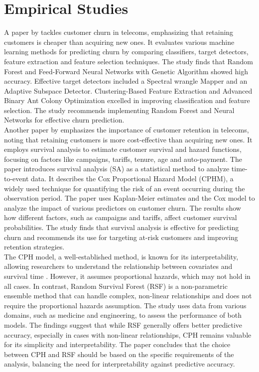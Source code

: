 \documentclass[doublespacing,12pt]{report}
\begin{document}
\section{Empirical Studies}
A paper by \cite{imani2020customer} tackles customer churn in telecoms, emphasizing that retaining customers is cheaper than acquiring new ones. It evaluates various machine learning methods for predicting churn by comparing classifiers, target detectors, feature extraction and feature selection techniques. The study finds that Random Forest and Feed-Forward Neural Networks with Genetic Algorithm showed high accuracy. Effective target detectors included a Spectral wrangle Mapper and an Adaptive Subspace Detector. Clustering-Based Feature Extraction and Advanced Binary Ant Colony Optimization excelled in improving classification and feature selection. The study recommends implementing Random Forest and Neural Networks for effective churn prediction.\\
Another paper by \cite{masarifoglu2019applying} emphasizes the importance of customer retention in telecoms, noting that retaining customers is more cost-effective than acquiring new ones. It employs survival analysis to estimate customer survival and hazard functions, focusing on factors like campaigns, tariffs, tenure, age and auto-payment. The paper introduces survival analysis (SA) as a statistical method to analyze time-to-event data. It describes the Cox Proportional Hazard Model (CPHM), a widely used technique for quantifying the risk of an event occurring during the observation period. The paper uses Kaplan-Meier estimates and the Cox model to analyze the impact of various predictors on customer churn. The results show how different factors, such as campaigns and tariffs, affect customer survival probabilities. The study finds that survival analysis is effective for predicting churn and recommends its use for targeting at-risk customers and improving retention strategies.\\
The CPH model, a well-established method, is known for its interpretability, allowing researchers to understand the relationship between covariates and survival time \cite{nurhaliza2022comparison}. However, it assumes proportional hazards, which may not hold in all cases. In contrast, Random Survival Forest (RSF) is a non-parametric ensemble method that can handle complex, non-linear relationships and does not require the proportional hazards assumption. The study uses data from various domains, such as medicine and engineering, to assess the performance of both models. The findings suggest that while RSF generally offers better predictive accuracy, especially in cases with non-linear relationships, CPH remains valuable for its simplicity and interpretability. The paper concludes that the choice between CPH and RSF should be based on the specific requirements of the analysis, balancing the need for interpretability against predictive accuracy.
\end{document}

